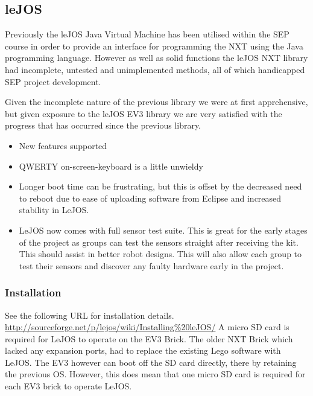 \documentclass[11pt, a4paper, oneside]{article}
\begin{document}
   	\subsection{leJOS}
	Previously the leJOS Java Virtual Machine has been utilised within the SEP course in order to provide an interface for programming the NXT using the Java programming language. However as well as solid functions the leJOS NXT library had incomplete, untested and unimplemented methods, all of which handicapped SEP project development.\newline \newline
	
	Given the incomplete nature of the previous library we were at first apprehensive, but given exposure to the leJOS EV3 library we are very satisfied with the progress that has occurred since the previous library.\\

	\begin{itemize}
		\item New features supported
		\item QWERTY on-screen-keyboard is a little unwieldy
		\item Longer boot time can be frustrating, but this is offset by the decreased need to reboot due to ease of uploading software from Eclipse and increased stability in LeJOS.
		\item LeJOS now comes with full sensor test suite. This is great for the early stages of the project as groups can test the sensors straight after receiving the kit. This should assist in better robot designs. This will also allow each group to test their sensors and discover any faulty hardware early in the project.
	\end{itemize}
	
	\subsubsection{Installation}
	See the following URL for installation details. \newline
	\url{http://sourceforge.net/p/lejos/wiki/Installing%20leJOS/}
	\newline\newline
	A micro SD card is required for LeJOS to operate on the EV3 Brick. The older NXT Brick which lacked any expansion ports, had to replace the existing Lego software with LeJOS. The EV3 however can boot off the SD card directly, there by retaining the previous OS. However, this does mean that one micro SD card is required for each EV3 brick to operate LeJOS. \newline
	
\end{document}
